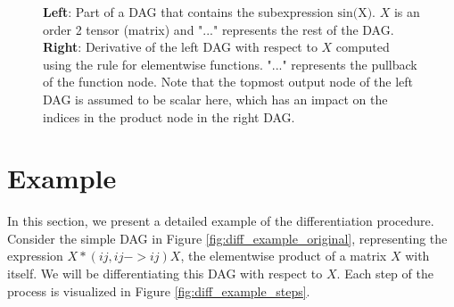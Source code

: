 \documentclass[12pt, a4paper]{report}
\begin{document}
\begin{figure}
    \centering
    \begin{minipage}{7cm}
        \centering
    \end{minipage}
    \begin{minipage}{7cm}
        \centering
    \end{minipage}
    \caption{\textbf{Left}: Part of a DAG that contains the subexpression $\text{sin(X)}$. $X$ is an order 2 tensor (matrix) and "..." represents the rest of the DAG. \textbf{Right}: Derivative of the left DAG with respect to $X$ computed using the rule for elementwise functions. "..." represents the pullback of the function node. Note that the topmost output node of the left DAG is assumed to be scalar here, which has an impact on the indices in the product node in the right DAG.}
    \label{fig:func_rule}
\end{figure}

\FloatBarrier
\section{Example}
In this section, we present a detailed example of the differentiation procedure.
Consider the simple DAG in Figure \ref{fig:diff_example_original}, representing the expression $X *(ij,ij->ij) X$, the elementwise product of a matrix $X$ with itself.
We will be differentiating this DAG with respect to $X$.
Each step of the process is visualized in Figure \ref{fig:diff_example_steps}.
\end{document}
